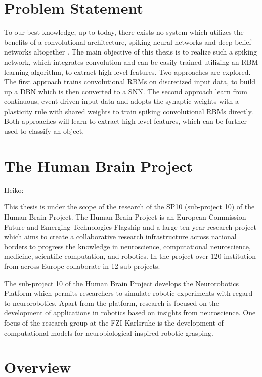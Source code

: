 \section{Problem Statement}

To our best knowledge, up to today, there exists no system which utilizes the benefits of a convolutional architecture, spiking neural networks and deep belief networks altogether . 
The main objective of this thesis is to realize such a spiking network, which integrates convolution and can be easily trained utilizing an RBM learning algorithm, to extract high level features. 
Two approaches are explored. 
The first approach trains convolutional RBMs on discretized input data, to build up a DBN which is then converted to a SNN. 
The second approach learn from continuous, event-driven input-data and adopts the synaptic weights with a plasticity rule with shared weights to train spiking convolutional RBMs directly. 
Both approaches will learn to extract high level features, which can be further used to classify an object. 

\section{The Human Brain Project}

Heiko:

This thesis is under the scope of the research of the SP10 (sub-project 10) of the Human Brain
Project. The Human Brain Project is an European Commission Future and Emerging Technologies Flagship and a large ten-year research project which aims to create a collaborative research infrastructure across national borders to progress the knowledge in neuroscience, computational neuroscience, medicine, scientific computation, and robotics. In the project over 120
institution from across Europe collaborate in 12 sub-projects.

The sub-project 10 of the Human Brain Project develops the Neurorobotics Platform which
permits researchers to simulate robotic experiments with regard to neurorobotics. Apart from the
platform, research is focused on the development of applications in robotics based on insights
from neuroscience. One focus of the research group at the FZI Karlsruhe is the development of
computational models for neurobiological inspired robotic grasping.


\section{Overview}

